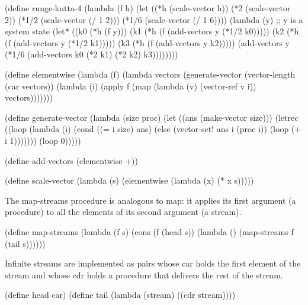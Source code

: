 \begin{schemenoindent}
(define runge-kutta-4
  (lambda (f h)
    (let ((*h (scale-vector h))
          (*2 (scale-vector 2))
          (*1/2 (scale-vector (/ 1 2)))
          (*1/6 (scale-vector (/ 1 6))))
      (lambda (y)
        ;; y {\rm{}is a system state}
        (let* ((k0 (*h (f y)))
               (k1 (*h (f (add-vectors y (*1/2 k0)))))
               (k2 (*h (f (add-vectors y (*1/2 k1)))))
               (k3 (*h (f (add-vectors y k2)))))
          (add-vectors y
            (*1/6 (add-vectors k0
                               (*2 k1)
                               (*2 k2)
                               k3))))))))

(define elementwise
  (lambda (f)
    (lambda vectors
      (generate-vector
        (vector-length (car vectors))
        (lambda (i)
          (apply f
                 (map (lambda (v) (vector-ref  v i))
                      vectors)))))))

(define generate-vector
  (lambda (size proc)
    (let ((ans (make-vector size)))
      (letrec ((loop
                (lambda (i)
                  (cond ((= i size) ans)
                        (else
                         (vector-set! ans i (proc i))
                         (loop (+ i 1)))))))
        (loop 0)))))

(define add-vectors (elementwise +))

(define scale-vector
  (lambda (s)
    (elementwise (lambda (x) (* x s)))))%
\end{schemenoindent}

The {\cf map-streams} procedure is analogous to {\cf map}: it applies its first
argument (a procedure) to all the elements of its second argument (a
stream).

\begin{schemenoindent}
(define map-streams
  (lambda (f s)
    (cons (f (head s))
          (lambda () (map-streams f (tail s))))))%
\end{schemenoindent}

Infinite streams are implemented as pairs whose car holds the first
element of the stream and whose cdr holds a procedure that delivers the rest
of the stream.

\begin{schemenoindent}
(define head car)
(define tail
  (lambda (stream) ((cdr stream))))%
\end{schemenoindent}

